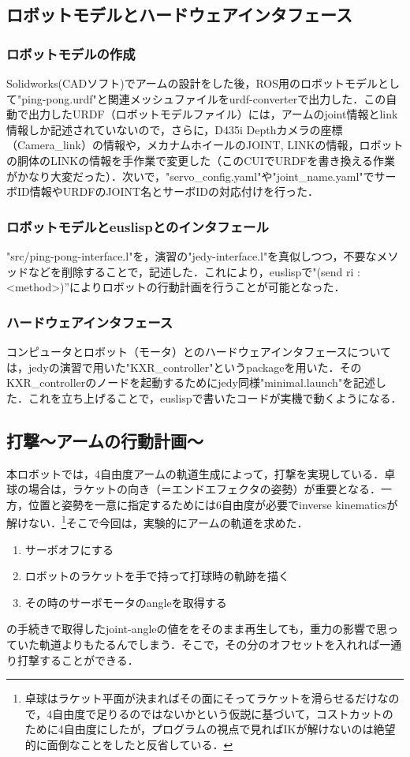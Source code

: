 \documentclass[10pt, oneside, titlepage]{ltjarticle}  %
\begin{document}
  \subsection{ロボットモデルとハードウェアインタフェース}
    \subsubsection{ロボットモデルの作成}
    Solidworks(CADソフト)でアームの設計をした後，ROS用のロボットモデルとして"ping-pong.urdf"と関連メッシュファイルをurdf-converterで出力した．この自動で出力したURDF（ロボットモデルファイル）には，アームのjoint情報とlink情報しか記述されていないので，さらに，D435i Depthカメラの座標（Camera\_link）の情報や，メカナムホイールのJOINT, LINKの情報，ロボットの胴体のLINKの情報を手作業で変更した（このCUIでURDFを書き換える作業がかなり大変だった）．次いで，"servo\_config.yaml"や"joint\_name.yaml"でサーボID情報やURDFのJOINT名とサーボIDの対応付けを行った．

    \subsubsection{ロボットモデルとeuslispとのインタフェール}
    "src/ping-pong-interface.l"を，演習の"jedy-interface.l"を真似しつつ，不要なメソッドなどを削除することで，記述した．これにより，euslispで"(send ri :<method>)”によりロボットの行動計画を行うことが可能となった．
    \subsubsection{ハードウェアインタフェース}
    コンピュータとロボット（モータ）とのハードウェアインタフェースについては，jedyの演習で用いた"KXR\_controller"というpackageを用いた．そのKXR\_controllerのノードを起動するためにjedy同様"minimal.launch"を記述した．これを立ち上げることで，euslispで書いたコードが実機で動くようになる．

    \subsection{打撃〜アームの行動計画〜}
    本ロボットでは，4自由度アームの軌道生成によって，打撃を実現している．卓球の場合は，ラケットの向き（＝エンドエフェクタの姿勢）が重要となる．一方，位置と姿勢を一意に指定するためには6自由度が必要でinverse kinematicsが解けない．\footnote{卓球はラケット平面が決まればその面にそってラケットを滑らせるだけなので，4自由度で足りるのではないかという仮説に基づいて，コストカットのために4自由度にしたが，プログラムの視点で見ればIKが解けないのは絶望的に面倒なことをしたと反省している．}そこで今回は，実験的にアームの軌道を求めた．
    \begin{enumerate}
      \item サーボオフにする
      \item ロボットのラケットを手で持って打球時の軌跡を描く
      \item その時のサーボモータのangleを取得する
    \end{enumerate}
    の手続きで取得したjoint-angleの値ををそのまま再生しても，重力の影響で思っていた軌道よりもたるんでしまう．そこで，その分のオフセットを入れれば一通り打撃することができる．
\end{document}
